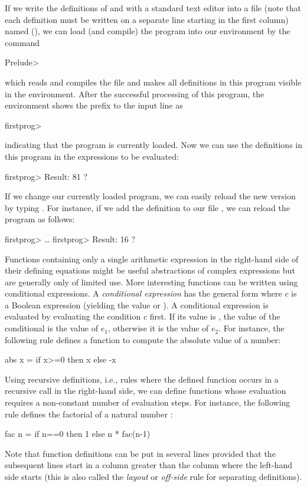 If we write the definitions of  and 
with a standard text editor
into a file (note that each definition must be written on a separate
line starting in the first column) named 
(),
we can load (and compile) the program into our environment
by the command
\begin{prog}
Prelude> 
\end{prog}
which reads and compiles the file  and
makes all definitions in this program visible in the environment.
After the successful processing of this program, the environment
shows the prefix to the input line as
\begin{prog}
firstprog>
\end{prog}
indicating that the program  is currently loaded.
Now we can use the definitions in this program in the expressions
to be evaluated:
\begin{prog}
firstprog> 
Result: 81 ? 
\end{prog}
If we change our currently loaded program, we can easily reload
the new version by typing . For instance,
if we add the definition  to our file
, we can reload the program as follows:
\begin{prog}
firstprog> 
\ldots
firstprog> 
Result: 16 ? 
\end{prog}
Functions containing only a single arithmetic expression in the
right-hand side of their defining equations might be useful abstractions
of complex expressions but are generally only of limited use.
More interesting functions can be written using conditional
expressions. A \emph{conditional expression}%
has the general form 
where $c$ is a Boolean expression (yielding the value 
or ). A conditional expression is evaluated by
evaluating the condition $c$ first. If its value is ,
the value of the conditional is the value of $e_1$, otherwise
it is the value of $e_2$. For instance, the following rule
defines a function to compute the absolute value of a number:
\begin{prog}
abs x = if x>=0 then x else -x
\end{prog}
Using recursive definitions, i.e., rules where the defined
function occurs in a recursive call in the right-hand side,
we can define functions whose evaluation requires a non-constant
number of evaluation steps. For instance, the following rule
defines the factorial of a natural number
:
\begin{prog}
fac n = if n==0 then 1
                else n * fac(n-1)
\end{prog}
Note that function definitions can be put in several lines
provided that the subsequent lines start in a column greater
than the column where the left-hand side starts
(this is also called the \emph{layout}
or \emph{off-side} rule for separating
definitions).

